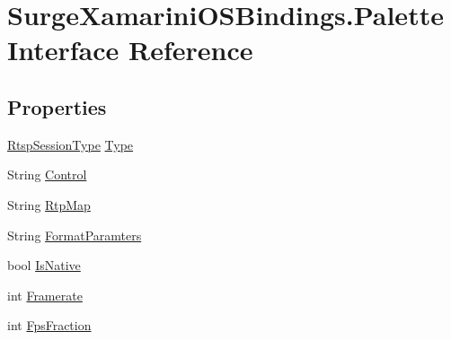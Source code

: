 \hypertarget{interface_surge_xamarini_o_s_bindings_1_1_palette}{}\section{Surge\+Xamarini\+O\+S\+Bindings.\+Palette Interface Reference}
\label{interface_surge_xamarini_o_s_bindings_1_1_palette}
\subsection*{Properties}
\begin{DoxyCompactItemize}
\item 
\hyperlink{namespace_surge_xamarini_o_s_bindings_ae265f95a36d7f788d0c279a0cd2da6c1}{Rtsp\+Session\+Type} \hyperlink{interface_surge_xamarini_o_s_bindings_1_1_palette_af1a3888051d080a0ecf11c13bad20db3}{Type}
\item 
String \hyperlink{interface_surge_xamarini_o_s_bindings_1_1_palette_a62003c6f6479d9e1b74dea73f0f47852}{Control}
\item 
String \hyperlink{interface_surge_xamarini_o_s_bindings_1_1_palette_aeac5b816677a34dcd874914773561518}{Rtp\+Map}
\item 
String \hyperlink{interface_surge_xamarini_o_s_bindings_1_1_palette_a8d76cff9180c38d19dd294aa0fb16384}{Format\+Paramters}
\item 
bool \hyperlink{interface_surge_xamarini_o_s_bindings_1_1_palette_a496447dbcab99dd25bb90587101ddd9d}{Is\+Native}
\item 
int \hyperlink{interface_surge_xamarini_o_s_bindings_1_1_palette_a9f811ea8b4222bbf7c1f261c20ee4d19}{Framerate}
\item 
int \hyperlink{interface_surge_xamarini_o_s_bindings_1_1_palette_aa5fdbb74f1d9370a77fb5421b0a3e49b}{Fps\+Fraction}
\item 

\end{DoxyCompactItemize}
